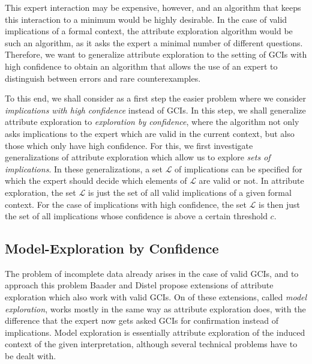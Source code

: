 This expert interaction may be expensive, however, and an algorithm that keeps this
interaction to a minimum would be highly desirable.  In the case of valid implications of
a formal context, the attribute exploration algorithm would be such an algorithm, as it
asks the expert a minimal number of different questions.  Therefore, we want to generalize
attribute exploration to the setting of GCIs with high confidence to obtain an algorithm
that allows the use of an expert to distinguish between errors and rare counterexamples.

To this end, we shall consider as a first step the easier problem where we consider
\emph{implications with high confidence} instead of GCIs.  In this step, we shall
generalize attribute exploration to \emph{exploration by confidence}, where the algorithm
not only asks implications to the expert which are valid in the current context, but also
those which only have high confidence.  For this, we first investigate generalizations of
attribute exploration which allow us to explore \emph{sets of implications}.  In these
generalizations, a set $\mathcal{L}$ of implications can be specified for which the expert
should decide which elements of $\mathcal{L}$ are valid or not.  In attribute exploration,
the set $\mathcal{L}$ is just the set of all valid implications of a given formal context.
For the case of implications with high confidence, the set $\mathcal{L}$ is then just the
set of all implications whose confidence is above a certain threshold $c$.

\subsection{Model-Exploration by Confidence}
\label{sec:model-expl-conf}

The problem of incomplete data already arises in the case of valid GCIs, and to approach
this problem Baader and Distel propose extensions of attribute exploration which also work
with valid GCIs.  On of these extensions, called \emph{model exploration}, works mostly in
the same way as attribute exploration does, with the difference that the expert now gets
asked GCIs for confirmation instead of implications.  Model exploration is essentially
attribute exploration of the induced context of the given interpretation, although several
technical problems have to be dealt with.

